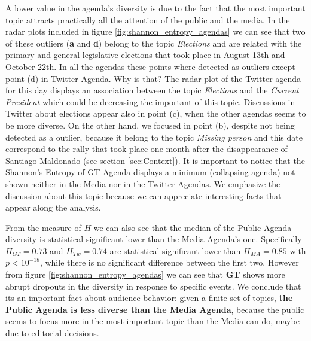 \documentclass[a4paper, 12pt]{article}
\begin{document}
\par A lower value in the agenda's diversity is due to the fact that the most important topic attracts practically all the attention of the public and the media.
In the radar plots included in figure \ref{fig:shannon_entropy_agendas} we can see that two of these outliers (\textbf{a} and \textbf{d}) belong to the topic \emph{Elections} and are related with the primary and general legislative elections that took place in August 13th and October 22th. 
In all the agendas these points where detected as outliers except point (d) in Twitter Agenda. Why is that? The radar plot of the Twitter agenda for this day displays an association between the topic \emph{Elections} and the \emph{Current President} which could be decreasing the important of this topic.
Discussions in Twitter about elections appear also in point (c), when the other agendas seems to be more diverse. 
On the other hand, we focused in point (b), despite not being detected as a outlier, because it belong to the topic \emph{Missing person} and this date correspond to the rally that took place one month after the disappearance of Santiago Maldonado (see section \ref{sec:Context}). It is important to notice that the Shannon's Entropy of GT Agenda displays a minimum (collapsing agenda) not shown neither in the Media nor in the Twitter Agendas.
We emphasize the discussion about this topic because we can appreciate  interesting facts that appear along the analysis.

\par From the measure of $H$ we can also see that the median of the Public Agenda diversity is statistical significant lower than the Media Agenda's one.
Specifically $H_{GT} = 0.73$ and $H_{Tw} = 0.74$ are statistical significant lower than $H_{MA} = 0.85$ with $p < 10^{-18}$, while there is no significant difference between the first two. 
However from figure \ref{fig:shannon_entropy_agendas} we can see that \textbf{GT} shows more abrupt dropouts in the diversity in response to specific events.
We conclude that its an important fact about audience behavior: given a finite set of topics, \textbf{the Public Agenda is less diverse than the Media Agenda}, because the public seems to focus more in the most important topic than the Media can do, maybe due to editorial decisions.
\end{document}
